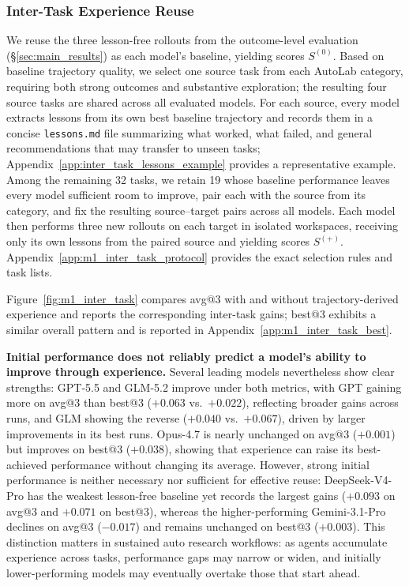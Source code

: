 \subsubsection{Inter-Task Experience Reuse}
\label{sec:m1_inter_task}

We reuse the three lesson-free rollouts from the outcome-level evaluation (\S\ref{sec:main_results}) as each model's baseline, yielding scores $S^{(0)}$.
Based on baseline trajectory quality, we select one source task from each AutoLab category, requiring both strong outcomes and substantive exploration; the resulting four source tasks are shared across all evaluated models.
For each source, every model extracts lessons from its own best baseline trajectory and records them in a concise \texttt{lessons.md} file summarizing what worked, what failed, and general recommendations that may transfer to unseen tasks; Appendix~\ref{app:inter_task_lessons_example} provides a representative example.
Among the remaining 32 tasks, we retain 19 whose baseline performance leaves every model sufficient room to improve, pair each with the source from its category, and fix the resulting source--target pairs across all models.
Each model then performs three new rollouts on each target in isolated workspaces, receiving only its own lessons from the paired source and yielding scores $S^{(+)}$.
Appendix~\ref{app:m1_inter_task_protocol} provides the exact selection rules and task lists.

Figure~\ref{fig:m1_inter_task} compares avg@3 with and without trajectory-derived experience and reports the corresponding inter-task gains; best@3 exhibits a similar overall pattern and is reported in Appendix~\ref{app:m1_inter_task_best}.


\textbf{Initial performance does not reliably predict a model's ability to improve through experience.}
Several leading models nevertheless show clear strengths: GPT-5.5 and GLM-5.2 improve under both metrics, with GPT gaining more on avg@3 than best@3 ($+0.063$ vs.\ $+0.022$), reflecting broader gains across runs, and GLM showing the reverse ($+0.040$ vs.\ $+0.067$), driven by larger improvements in its best runs.
Opus-4.7 is nearly unchanged on avg@3 ($+0.001$) but improves on best@3 ($+0.038$), showing that experience can raise its best-achieved performance without changing its average.
However, strong initial performance is neither necessary nor sufficient for effective reuse: DeepSeek-V4-Pro has the weakest lesson-free baseline yet records the largest gains ($+0.093$ on avg@3 and $+0.071$ on best@3), whereas the higher-performing Gemini-3.1-Pro declines on avg@3 ($-0.017$) and remains unchanged on best@3 ($+0.003$).
This distinction matters in sustained auto research workflows: as agents accumulate experience across tasks, performance gaps may narrow or widen, and initially lower-performing models may eventually overtake those that start ahead.

